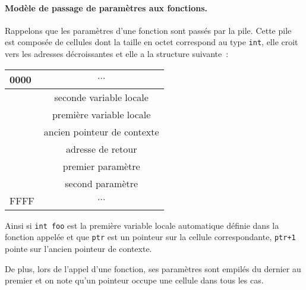 \paragraph{Mod\`ele de passage de param\`etres aux fonctions.}
Rappelons que les param\`etres d'une fonction sont pass\'es par la
pile. Cette pile est compos\'ee de cellules dont la taille en octet
correspond au type \verb?int?, elle croit vers les adresses
d\'ecroissantes et elle a la structure suivante~:
\begin{center}
  \begin{tabular}{l|c|}
    \hline 
    0000 & $\cdots$ \\ \hline
    & seconde variable locale \\ \hline
    & premi\`ere variable locale \\ \hline
    & ancien pointeur de contexte \\ \hline
    & adresse de retour \\ \hline
    & premier param\`etre \\ \hline
    & second param\`etre \\ \hline
    FFFF &$\cdots$ \\ \hline
  \end{tabular}
\end{center}
Ainsi si \verb?int foo? est la premi\`ere variable locale automatique
d\'efinie dans la fonction appel\'ee et que \verb?ptr?  est un
pointeur sur la cellule correspondante, \verb?ptr+1? pointe sur
l'ancien pointeur de contexte.
\par
De plus, lors de l'appel d'une fonction, ses param\`etres sont
empil\'es du dernier au premier et on note qu'un pointeur occupe une
cellule dans tous les cas.

